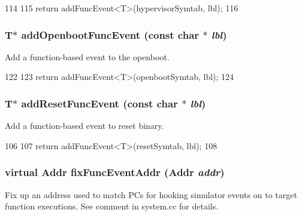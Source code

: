 \begin{DoxyCode}
114     {
115         return addFuncEvent<T>(hypervisorSymtab, lbl);
116     }
\end{DoxyCode}
\hypertarget{classSparcSystem_abe429690e878f6801b670e0a269151ad}{
\subsubsection[{addOpenbootFuncEvent}]{\setlength{\rightskip}{0pt plus 5cm}T$\ast$ addOpenbootFuncEvent (const char $\ast$ {\em lbl})}}
\label{classSparcSystem_abe429690e878f6801b670e0a269151ad}
Add a function-\/based event to the openboot. 


\begin{DoxyCode}
122     {
123         return addFuncEvent<T>(openbootSymtab, lbl);
124     }
\end{DoxyCode}
\hypertarget{classSparcSystem_ac772c1ca4822ba2a88be95ef2d3fdf1f}{
\subsubsection[{addResetFuncEvent}]{\setlength{\rightskip}{0pt plus 5cm}T$\ast$ addResetFuncEvent (const char $\ast$ {\em lbl})}}
\label{classSparcSystem_ac772c1ca4822ba2a88be95ef2d3fdf1f}
Add a function-\/based event to reset binary. 


\begin{DoxyCode}
106     {
107         return addFuncEvent<T>(resetSymtab, lbl);
108     }
\end{DoxyCode}
\hypertarget{classSparcSystem_aff94f650c5eef23b8dc350ea755bdef4}{
\subsubsection[{fixFuncEventAddr}]{\setlength{\rightskip}{0pt plus 5cm}virtual {\bf Addr} fixFuncEventAddr ({\bf Addr} {\em addr})}}
\label{classSparcSystem_aff94f650c5eef23b8dc350ea755bdef4}
Fix up an address used to match PCs for hooking simulator events on to target function executions. See comment in system.cc for details. 

